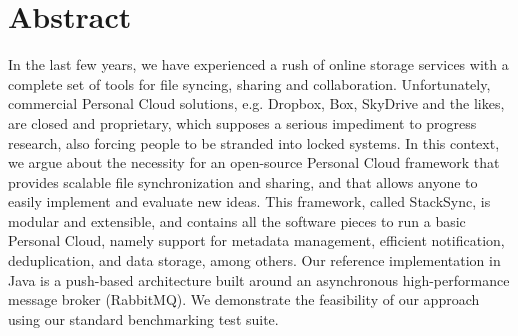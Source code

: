 \chapter*{Abstract}

In the last few years, we have experienced a rush of online storage services with 
a complete set of tools for file syncing, sharing and collaboration.
Unfortunately, commercial Personal Cloud solutions, e.g. Dropbox, Box, SkyDrive and the likes, are
closed and proprietary, which supposes a serious impediment to progress research, also forcing
people to be stranded into locked systems. In this context, we
argue about the necessity for an open-source Personal Cloud framework that provides scalable file synchronization
and sharing, and that allows anyone to easily	implement and evaluate new ideas.
This framework, called StackSync, is modular and extensible, and contains all the software pieces to run
a basic Personal Cloud, namely support for metadata management, efficient notification, deduplication, and data
storage, among others. Our reference implementation in Java is a push-based architecture built around an asynchronous 
high-performance message broker (RabbitMQ). We demonstrate the feasibility of our approach using
our standard benchmarking test suite.

